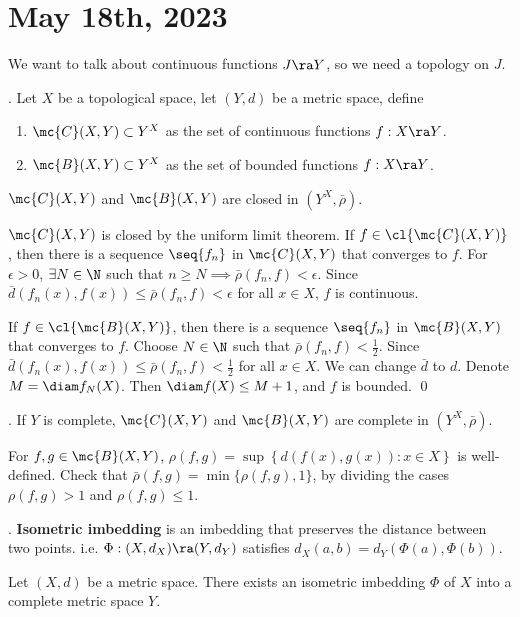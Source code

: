 \section*{May 18th, 2023}

We want to talk about continuous functions \(J \ra Y\), so we need a topology on \(J\).

. Let \(X\) be a topological space, let \((Y, d)\) be a metric space, define
\begin{enumerate}
    \item \(\mc{C}(X, Y) \subset Y^X\) as the set of continuous functions \(f : X \ra Y\).
    \item \(\mc{B}(X, Y) \subset Y^X\) as the set of bounded functions \(f : X \ra Y\).
\end{enumerate}

 \(\mc{C}(X, Y)\) and \(\mc{B}(X, Y)\) are closed in \((Y^X, \bar{\rho})\).

\pf \(\mc{C}(X, Y)\) is closed by the uniform limit theorem. If \(f \in \cl{\mc{C}(X, Y)}\), then there is a sequence \(\seq{f_n}\) in \(\mc{C}(X, Y)\) that converges to \(f\). For \(\epsilon > 0\), \(\exists N \in \N\) such that \(n \geq N \implies \bar{\rho}(f_n, f) < \epsilon\). Since \(\bar{d}(f_n(x), f(x)) \leq \bar{\rho}(f_n, f) < \epsilon\) for all \(x \in X\), \(f\) is continuous.

If \(f \in \cl{\mc{B}(X, Y)}\), then there is a sequence \(\seq{f_n}\) in \(\mc{B}(X, Y)\) that converges to \(f\). Choose \(N \in \N\) such that \(\bar{\rho}(f_n, f) < \frac{1}{2}\). Since \(\bar{d}(f_n(x), f(x)) \leq \bar{\rho}(f_n, f) < \frac{1}{2}\) for all \(x \in X\). We can change \(\bar{d}\) to \(d\). Denote \(M = \diam f_N(X)\). Then \(\diam f(X) \leq M + 1\), and \(f\) is bounded. \qed

\cor. If \(Y\) is complete, \(\mc{C}(X, Y)\) and \(\mc{B}(X, Y)\) are complete in \((Y^X, \bar{\rho})\).

\rmk For \(f, g \in \mc{B}(X, Y)\), \(\rho(f, g) = \sup\left\{d(f(x), g(x)) : x\in X\right\}\) is well-defined. Check that \(\bar{\rho}(f, g) = \min\{\rho(f, g), 1\}\), by dividing the cases \(\rho(f, g) > 1\) and \(\rho(f, g) \leq 1\).

.  \textbf{Isometric imbedding} is an imbedding that preserves the distance between two points. i.e. \(\Phi : (X, d_X) \ra (Y, d_Y)\) satisfies \(d_X(a, b) = d_Y(\Phi(a), \Phi(b))\).

 Let \((X, d)\) be a metric space. There exists an isometric imbedding \(\Phi\) of \(X\) into a complete metric space \(Y\).

